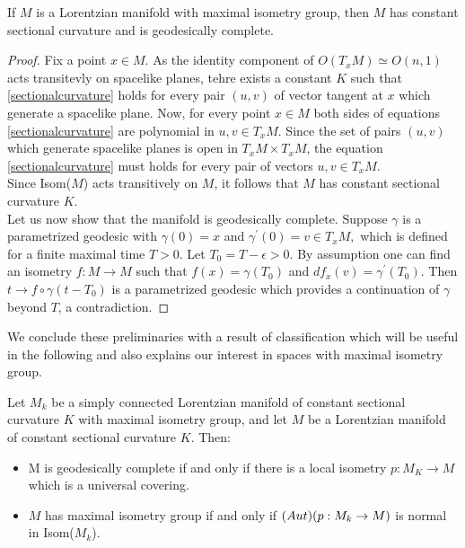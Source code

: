 \begin{lemma}\label{maximalisometry}
    If $M$ is a Lorentzian manifold with maximal isometry group, then $M$ has constant sectional curvature and is geodesically complete.
\end{lemma}

\begin{proof}
    Fix a point $x\in M$. As the identity component of $O(T_x M)\simeq O(n,1)$ acts transitevly on spacelike planes, tehre exists a constant $K$ such that \ref{sectionalcurvature} holds for every pair $(u,v)$ of vector tangent at $x$ which generate a spacelike plane. Now, for every point $x\in M$ both sides of equations \ref{sectionalcurvature} are polynomial in $u,v \in T_xM$. Since the set of pairs $(u,v)$ which generate spacelike planes is open in $T_{x}M\times T_{x}M$, the equation \ref{sectionalcurvature} must holds for every pair of vectors $u,v \in T_xM$.\\ Since Isom($M$) acts transitively on $M$, it follows that $M$ has constant sectional curvature $K$.\\
    Let us now show that the manifold is geodesically complete. Suppose $\gamma$ is a parametrized geodesic with $\gamma(0)=x$ and $\gamma^{\prime} (0)=v\in T_xM,$ which is defined for a finite maximal time $T>0.$ Let $T_0=T-\epsilon>0.$ By assumption one can find an isometry $f:M\to M$ such that $f(x)=\gamma(T_0)$ and $df_x(v)=\gamma^{\prime}(T_0).$ Then $t\to f\circ\gamma(t-T_0)$ is a parametrized geodesic which provides a continuation of $\gamma$ beyond $T$, a contradiction. 
\end{proof}

We conclude these preliminaries with a result of classification which will be useful in the following and also explains our interest in spaces with maximal isometry group.
\begin{proposition}\label{classification}
    Let $M_k$ be a simply connected Lorentzian manifold of constant sectional curvature $K$ with maximal isometry group, and let $M$ be a Lorentzian manifold of constant sectional curvature $K$. Then: 
    \begin{itemize}
        \item M is geodesically complete if and only if there is a local isometry $p:M_K\to M$ which is a universal covering.
        \item $M$ has maximal isometry group if and only if $\text(Aut)(p:M_k\to M)$ is normal in Isom($M_k$). 
    \end{itemize}
\end{proposition}

